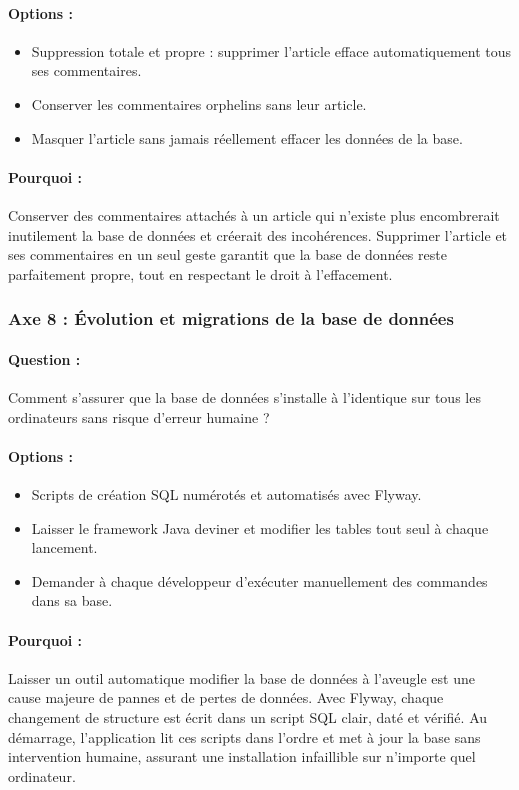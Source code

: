\documentclass[11pt,a4paper]{article}
\begin{document}
\paragraph{Options :}
\begin{itemize}
    \item[$\boxtimes$] Suppression totale et propre : supprimer l'article efface automatiquement tous ses commentaires.
    \item[$\square$] Conserver les commentaires orphelins sans leur article.
    \item[$\square$] Masquer l'article sans jamais réellement effacer les données de la base.
\end{itemize}
\paragraph{Pourquoi :} Conserver des commentaires attachés à un article qui n'existe plus encombrerait inutilement la base de données et créerait des incohérences. Supprimer l'article et ses commentaires en un seul geste garantit que la base de données reste parfaitement propre, tout en respectant le droit à l'effacement.

\subsubsection{Axe 8 : Évolution et migrations de la base de données}
\paragraph{Question :} Comment s'assurer que la base de données s'installe à l'identique sur tous les ordinateurs sans risque d'erreur humaine ?
\paragraph{Options :}
\begin{itemize}
    \item[$\boxtimes$] Scripts de création SQL numérotés et automatisés avec Flyway.
    \item[$\square$] Laisser le framework Java deviner et modifier les tables tout seul à chaque lancement.
    \item[$\square$] Demander à chaque développeur d'exécuter manuellement des commandes dans sa base.
\end{itemize}
\paragraph{Pourquoi :} Laisser un outil automatique modifier la base de données à l'aveugle est une cause majeure de pannes et de pertes de données. Avec Flyway, chaque changement de structure est écrit dans un script SQL clair, daté et vérifié. Au démarrage, l'application lit ces scripts dans l'ordre et met à jour la base sans intervention humaine, assurant une installation infaillible sur n'importe quel ordinateur.
\end{document}
